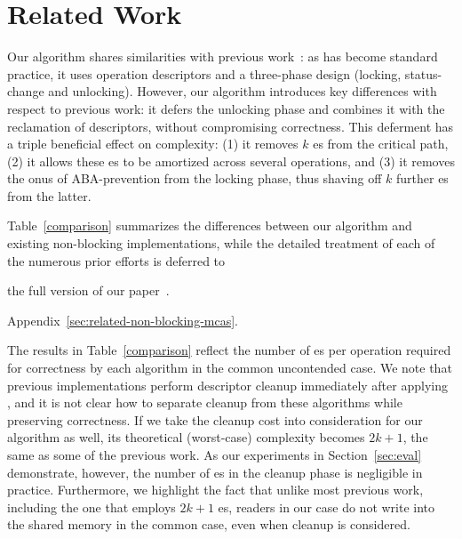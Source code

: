 

\section{Related Work}
\label{sec:related-work}

Our algorithm shares similarities with previous work~\cite{harris02,wang18}: as has become standard practice, it uses operation descriptors and a three-phase design (locking, status-change and unlocking). However, our algorithm introduces key differences with respect to previous work: it defers the unlocking phase and combines it with the reclamation of descriptors, without compromising correctness. This deferment has a triple beneficial effect on complexity: (1) it removes $k$ \cas{}es from the critical path, (2) it allows these \cas{}es to be amortized across several operations, and (3) it removes the onus of ABA-prevention from the locking phase, thus shaving off $k$ further \cas{}es from the latter.

Table~\ref{comparison} summarizes the differences between our algorithm and  existing non-blocking \mcas{} implementations, while the detailed treatment of each of the numerous prior efforts is deferred to
\begin{camera} 
the full version of our paper~\cite{longversion}.
\end{camera}\begin{arxiv}
Appendix~\ref{sec:related-non-blocking-mcas}. 
\end{arxiv} 
The results in Table~\ref{comparison} reflect the number of \cas{}es per \mcas{} operation required for correctness by each algorithm in the common uncontended case.
We note that previous \mcas{} implementations perform descriptor cleanup immediately after applying \mcas{}, and it is not clear how to separate cleanup from these algorithms while preserving correctness.
If we take the cleanup cost into consideration for our algorithm as well, its theoretical (worst-case) complexity becomes $2k+1$, the same as some of the previous work.
As our experiments in Section~\ref{sec:eval} demonstrate,
however, the number of \cas{}es in the cleanup phase is negligible in practice. Furthermore, we highlight the fact that unlike most previous work, including the one that employs $2k+1$ \cas{}es, readers in our case do not write into the shared memory in the common case, even when cleanup is considered.


